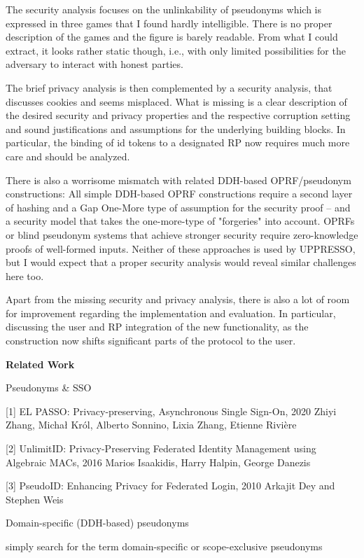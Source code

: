 \documentclass[letterpaper,onecolumn,10pt]{article}
\begin{document}
The security analysis focuses on the unlinkability of pseudonyms which is expressed in three games that I found hardly intelligible. There is no proper description of the games and the figure is barely readable. From what I could extract, it looks rather static though, i.e., with only limited possibilities for the adversary to interact with honest parties. 

The brief privacy analysis is then complemented by a security analysis, that discusses cookies and seems misplaced. 
What is missing is a clear description of the desired security and privacy properties and the respective corruption setting and sound justifications and assumptions for the underlying building blocks. In particular, the binding of id tokens to a designated RP now requires much more care and should be analyzed.

There is also a worrisome mismatch with related DDH-based OPRF/pseudonym constructions: All simple DDH-based OPRF constructions require a second layer of hashing and a Gap One-More type of assumption for the security proof -- and a security model that takes the one-more-type of "forgeries" into account. OPRFs or blind pseudonym systems that achieve stronger security require zero-knowledge proofs of well-formed inputs. Neither of these approaches is used by UPPRESSO, but I would expect that a proper security analysis would reveal similar challenges here too.

Apart from the missing security and privacy analysis, there is also a lot of room for improvement regarding the implementation and evaluation. In particular, discussing the user and RP integration of the new functionality, as the construction now shifts significant parts of the protocol to the user.


\vspace{1mm}\noindent\textbf{Related Work}


Pseudonyms \& SSO


[1] EL PASSO: Privacy-preserving, Asynchronous Single Sign-On, 2020
Zhiyi Zhang, Michał Król, Alberto Sonnino, Lixia Zhang, Etienne Rivière

[2] UnlimitID: Privacy-Preserving Federated Identity Management using Algebraic MACs, 2016
Marios Isaakidis, Harry Halpin, George Danezis

[3] PseudoID: Enhancing Privacy for Federated Login, 2010
Arkajit Dey and Stephen Weis

Domain-specific (DDH-based) pseudonyms


simply search for the term domain-specific or scope-exclusive pseudonyms
\end{document}
